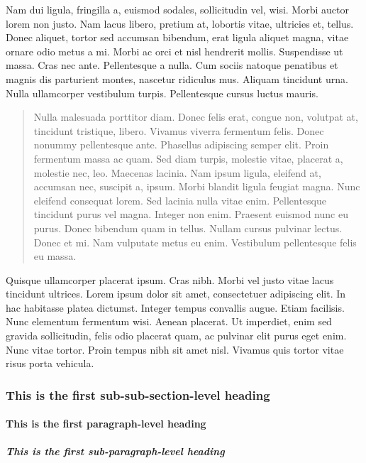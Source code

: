 Nam dui ligula, fringilla a, euismod sodales, sollicitudin vel, wisi. Morbi auctor
lorem non justo. Nam lacus libero, pretium at, lobortis vitae, ultricies et, tellus. Donec
aliquet, tortor sed accumsan bibendum, erat ligula aliquet magna, vitae ornare odio
metus a mi. Morbi ac orci et nisl hendrerit mollis. Suspendisse ut massa. Cras nec ante.
Pellentesque a nulla. Cum sociis natoque penatibus et magnis dis parturient montes,
nascetur ridiculus mus. Aliquam tincidunt urna. Nulla ullamcorper vestibulum turpis.
Pellentesque cursus luctus mauris.

\begin{quote}
Nulla malesuada porttitor diam. Donec felis erat, congue non, volutpat
at, tincidunt tristique, libero. Vivamus viverra fermentum felis. Donec
nonummy pellentesque ante. Phasellus adipiscing semper elit. Proin
fermentum massa ac quam. Sed diam turpis, molestie vitae, placerat
a, molestie nec, leo. Maecenas lacinia. Nam ipsum ligula, eleifend at,
accumsan nec, suscipit a, ipsum. Morbi blandit ligula feugiat magna.
Nunc eleifend consequat lorem. Sed lacinia nulla vitae enim. Pellentesque
tincidunt purus vel magna. Integer non enim. Praesent euismod nunc eu
purus. Donec bibendum quam in tellus. Nullam cursus pulvinar lectus.
Donec et mi. Nam vulputate metus eu enim. Vestibulum pellentesque
felis eu massa.
\end{quote}

Quisque ullamcorper placerat ipsum. Cras nibh. Morbi vel justo vitae lacus tincidunt
ultrices. Lorem ipsum dolor sit amet, consectetuer adipiscing elit. In hac habitasse
platea dictumst. Integer tempus convallis augue. Etiam facilisis. Nunc elementum
fermentum wisi. Aenean placerat. Ut imperdiet, enim sed gravida sollicitudin, felis
odio placerat quam, ac pulvinar elit purus eget enim. Nunc vitae tortor. Proin tempus
nibh sit amet nisl. Vivamus quis tortor vitae risus porta vehicula.

\subsubsection{This is the first sub-sub-section-level heading}

\lipsum[1]

\paragraph{This is the first paragraph-level heading}

\lipsum[1]

\subparagraph{This is the first sub-paragraph-level heading}

\lipsum[1]

